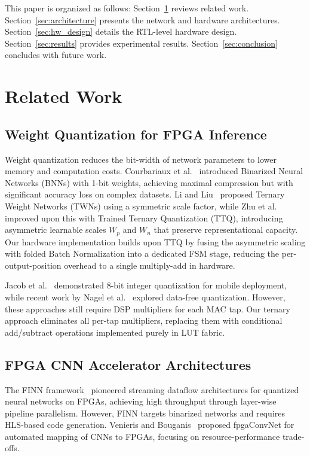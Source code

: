 \documentclass[conference]{IEEEtran}
\begin{document}
This paper is organized as follows: Section~\ref{sec:related} reviews related work. Section~\ref{sec:architecture} presents the network and hardware architectures. Section~\ref{sec:hw_design} details the RTL-level hardware design. Section~\ref{sec:results} provides experimental results. Section~\ref{sec:conclusion} concludes with future work.


\section{Related Work}
\label{sec:related}

\subsection{Weight Quantization for FPGA Inference}

Weight quantization reduces the bit-width of network parameters to lower memory and computation costs. Courbariaux et al.~\cite{courbariaux2016} introduced Binarized Neural Networks (BNNs) with 1-bit weights, achieving maximal compression but with significant accuracy loss on complex datasets. Li and Liu~\cite{li2016} proposed Ternary Weight Networks (TWNs) using a symmetric scale factor, while Zhu et al.~\cite{zhu2017} improved upon this with Trained Ternary Quantization (TTQ), introducing asymmetric learnable scales $W_p$ and $W_n$ that preserve representational capacity. Our hardware implementation builds upon TTQ by fusing the asymmetric scaling with folded Batch Normalization into a dedicated FSM stage, reducing the per-output-position overhead to a single multiply-add in hardware.

Jacob et al.~\cite{jacob2018} demonstrated 8-bit integer quantization for mobile deployment, while recent work by Nagel et al.~\cite{nagel2021} explored data-free quantization. However, these approaches still require DSP multipliers for each MAC tap. Our ternary approach eliminates all per-tap multipliers, replacing them with conditional add/subtract operations implemented purely in LUT fabric.

\subsection{FPGA CNN Accelerator Architectures}

The FINN framework~\cite{umuroglu2017,blott2018} pioneered streaming dataflow architectures for quantized neural networks on FPGAs, achieving high throughput through layer-wise pipeline parallelism. However, FINN targets binarized networks and requires HLS-based code generation. Venieris and Bouganis~\cite{venieris2018} proposed fpgaConvNet for automated mapping of CNNs to FPGAs, focusing on resource-performance trade-offs.
\end{document}
